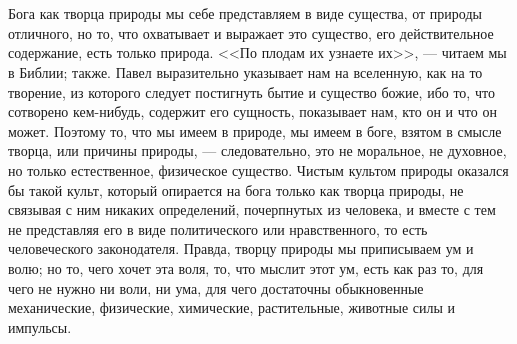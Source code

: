 \documentclass[12pt]{article}
\begin{document}
\section{}

Бога как творца природы мы себе представляем в виде существа, от природы отличного, но то, что охватывает и выражает это существо, его действительное содержание, есть только природа. <<По плодам их узнаете их>>, --- читаем мы в Библии; также. Павел выразительно указывает нам на вселенную, как на то творение, из которого следует постигнуть бытие и существо божие, ибо то, что сотворено кем-нибудь, содержит его сущность, показывает нам, кто он и что он может. Поэтому то, что мы имеем в природе, мы имеем в боге, взятом в смысле творца, или причины природы, --- следовательно, это не моральное, не духовное, но только естественное, физическое существо. Чистым культом природы оказался бы такой культ, который опирается на бога только как творца природы, не связывая с ним никаких определений, почерпнутых из человека, и вместе с тем не представляя его в виде политического или нравственного, то есть человеческого законодателя. Правда, творцу природы мы приписываем ум и волю; но то, чего хочет эта воля, то, что мыслит этот ум, есть как раз то, для чего не нужно ни воли, ни ума, для чего достаточны обыкновенные механические, физические, химические, растительные, животные силы и импульсы.



\section{}
\end{document}
